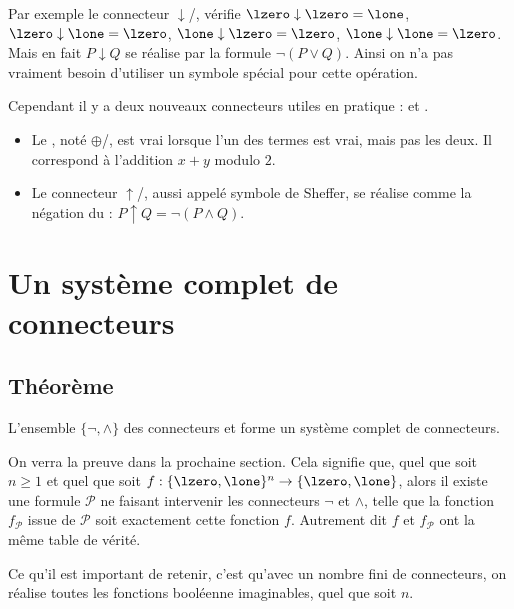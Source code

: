 \documentclass[11pt,class=report,crop=false]{standalone}
\begin{document}
Par exemple le connecteur $\downarrow$/, vérifie 
$\lzero\downarrow\lzero=\lone$, 
$\lzero\downarrow\lone=\lzero$, 
$\lone\downarrow\lzero=\lzero$, 
$\lone\downarrow\lone=\lzero$. Mais en fait $P \downarrow Q$ se réalise par la formule $\lnot(P \lor Q)$. Ainsi on n'a pas vraiment besoin d'utiliser un symbole spécial pour cette opération.

Cependant il y a deux nouveaux connecteurs utiles en pratique :  et .
\begin{itemize}
	\item Le , noté $\oplus$/, est vrai lorsque l'un des termes est vrai, mais pas les deux. Il correspond à l'addition $x+y$ modulo $2$.
	
	\item Le connecteur $\uparrow$/, aussi appelé symbole de Sheffer, se réalise comme la négation du \tand{} : $P \uparrow Q = \lnot(P\land Q)$.
\end{itemize}




\section{Un système complet de connecteurs}

\subsection{Théorème}

\begin{theoreme}
	L'ensemble $\{ \lnot, \land \}$ des connecteurs \tnot{} et \tand{} forme un système complet de connecteurs.
\end{theoreme}

On verra la preuve dans la prochaine section. Cela signifie que, quel que soit $n \ge 1$ et quel que soit $f : \{\lzero,\lone\}^n \to \{\lzero,\lone\}$, alors il existe une formule $\mathcal{P}$ ne faisant intervenir les connecteurs $\lnot$ et $\land$, telle que la fonction $f_{\mathcal{P}}$ issue de $\mathcal{P}$ soit exactement cette fonction $f$.
Autrement dit $f$ et $f_{\mathcal{P}}$ ont la même table de vérité.

Ce qu'il est important de retenir, c'est qu'avec un nombre fini de connecteurs, on réalise toutes les fonctions booléenne imaginables, quel que soit $n$.
\end{document}
